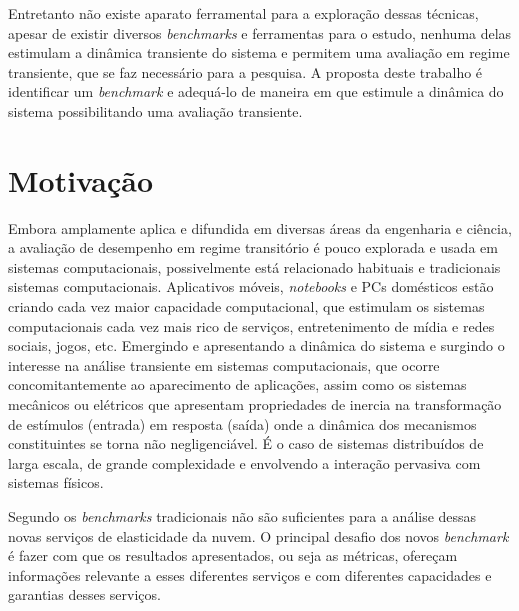 Entretanto não existe aparato ferramental para a exploração dessas técnicas, apesar de existir diversos \textit{benchmarks} e ferramentas para o estudo, nenhuma delas estimulam a dinâmica transiente do sistema e permitem uma avaliação em regime transiente, que se faz necessário para a pesquisa. A proposta deste trabalho é identificar um \textit{benchmark} e adequá-lo de maneira em que estimule a dinâmica do sistema possibilitando uma avaliação transiente.


\section{Motivação}
Embora amplamente aplica e difundida em diversas áreas da engenharia e ciência, a avaliação de desempenho em regime transitório é pouco explorada e usada em sistemas computacionais, possivelmente está relacionado habituais e tradicionais sistemas computacionais. Aplicativos móveis, \textit{notebooks} e PCs domésticos estão criando cada vez maior capacidade computacional, que estimulam os sistemas computacionais cada vez mais rico de serviços, entretenimento de mídia e redes sociais, jogos, etc. Emergindo e apresentando a dinâmica do sistema e surgindo o interesse na análise transiente em sistemas computacionais, que ocorre concomitantemente ao aparecimento de aplicações, assim como os sistemas mecânicos ou elétricos que apresentam propriedades de inercia na transformação de estímulos (entrada) em resposta (saída) onde a dinâmica dos mecanismos constituintes se torna não negligenciável. É o caso de sistemas distribuídos de larga escala, de grande complexidade e envolvendo a interação pervasiva com sistemas físicos. \cite{Egami2011, Kannan2011} 

Segundo \cite{Binnig2009} os \textit{benchmarks} tradicionais não são suficientes para a análise dessas novas serviços de elasticidade da nuvem. O principal desafio dos novos \textit{benchmark} é fazer com que os resultados apresentados, ou seja as métricas, ofereçam informações relevante a esses diferentes serviços e com diferentes capacidades e garantias desses serviços.

